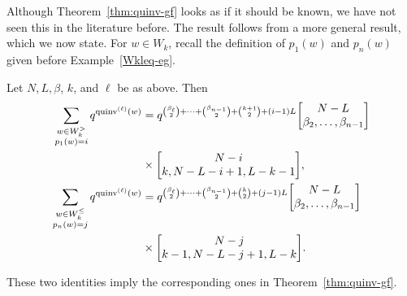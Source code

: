 \documentclass[ALCO,Unicode]{cedram}
\DeclareMathOperator{\quinvL}{\quinv^{(\ell)}}
\DeclareMathOperator{\quinv}{quinv}
\newcommand{\qbinom}[2]{\bgroup\renewcommand*{\arraystretch}{1}\begin{bmatrix} #1 \\ #2\end{bmatrix} \egroup}
\begin{document}
Although Theorem~\ref{thm:quinv-gf} looks as if it should be known, we have not seen this in the literature before. The result follows from a more general result, which we now state. 
For $w \in W_k$, recall the definition of $p_1(w)$ and $p_n(w)$ given before Example~\ref{Wkleq-eg}.

\begin{theorem}
\label{thm:quinv-refined-gf}
Let $N, L, \beta$, $k$, and $\ell$ be as above. 
Then
\begin{align}
\label{quinv-ref-gf>}
\sum_{\substack{ w \in W_k^> \\ p_1(w) = i}} q^{\quinvL(w)} &= q^{\binom{\beta_\ell}{2} + \cdots + \binom{\beta_{n-1}}{2} + \binom{k+1}{2} + (i-1)L} 
\qbinom{N-L}{\beta_2,\dots,\beta_{n-1}} \cr 
& \times \qbinom{N-i}{k, N-L-i+1, L-k-1}, \\
\label{quinv-ref-gf<}
\sum_{\substack{ w \in W_k^\leq \\ p_n(w) = j}} q^{\quinvL(w)} &= q^{\binom{\beta_\ell}{2} + \cdots + \binom{\beta_{n-1}}{2}+\binom{k}{2} + (j-1) L} 
\qbinom{N-L}{\beta_2,\dots,\beta_{n-1}} \cr 
& \times \qbinom{N-j}{k-1, N-L-j+1, L-k}.
\end{align} \end{theorem}

These two identities imply the corresponding ones in Theorem~\ref{thm:quinv-gf}.
\end{document}
